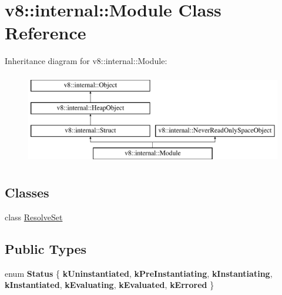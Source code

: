 \hypertarget{classv8_1_1internal_1_1Module}{}\section{v8\+:\+:internal\+:\+:Module Class Reference}
\label{classv8_1_1internal_1_1Module}
Inheritance diagram for v8\+:\+:internal\+:\+:Module\+:\begin{figure}[H]
\begin{center}
\leavevmode
\includegraphics[height=4.000000cm]{classv8_1_1internal_1_1Module}
\end{center}
\end{figure}
\subsection*{Classes}
\begin{DoxyCompactItemize}
\item 
class \mbox{\hyperlink{classv8_1_1internal_1_1Module_1_1ResolveSet}{Resolve\+Set}}
\end{DoxyCompactItemize}
\subsection*{Public Types}
\begin{DoxyCompactItemize}
\item 
\mbox{\label{classv8_1_1internal_1_1Module_a09ce29de807d3dae0277a0479d3e2cee}} 
enum {\bfseries Status} \{ \newline
{\bfseries k\+Uninstantiated}, 
{\bfseries k\+Pre\+Instantiating}, 
{\bfseries k\+Instantiating}, 
{\bfseries k\+Instantiated}, 
\newline
{\bfseries k\+Evaluating}, 
{\bfseries k\+Evaluated}, 
{\bfseries k\+Errored}
 \}
\end{DoxyCompactItemize}
